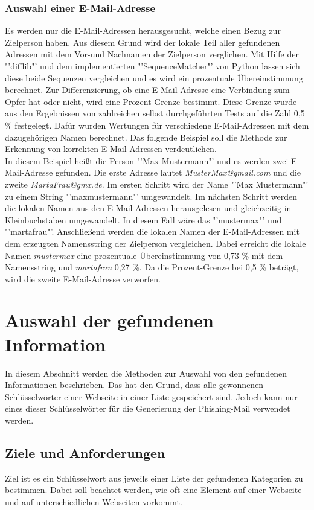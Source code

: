 		\subsubsection{Auswahl einer E-Mail-Adresse}
		Es werden nur die E-Mail-Adressen herausgesucht, welche einen Bezug zur Zielperson haben. Aus diesem Grund wird der lokale Teil aller gefundenen Adressen mit dem Vor-und Nachnamen der Zielperson verglichen. Mit Hilfe der "'difflib"' und dem implementierten "'SequenceMatcher"' von Python lassen sich diese beide Sequenzen vergleichen und es wird ein prozentuale Übereinstimmung berechnet. Zur Differenzierung, ob eine E-Mail-Adresse eine Verbindung zum Opfer hat oder nicht, wird eine Prozent-Grenze bestimmt. Diese Grenze wurde aus den Ergebnissen von zahlreichen selbst durchgeführten Tests auf die Zahl 0,5 \% festgelegt. Dafür wurden Wertungen für verschiedene E-Mail-Adressen mit dem dazugehörigen Namen berechnet. Das folgende Beispiel soll die Methode zur Erkennung von korrekten E-Mail-Adressen verdeutlichen.\\
		In diesem Beispiel heißt die Person "'Max Mustermann"' und es werden zwei E-Mail-Adresse gefunden. Die erste Adresse lautet \textit{MusterMax@gmail.com} und die zweite \textit{MartaFrau@gmx.de}. Im ersten Schritt wird der Name "'Max Mustermann"' zu einem String "'maxmustermann"' umgewandelt. Im nächsten Schritt werden die lokalen Namen aus den E-Mail-Adressen herausgelesen und gleichzeitig in Kleinbuchstaben umgewandelt. In diesem Fall wäre das "'mustermax"' und "'martafrau"'. Anschließend werden die lokalen Namen der E-Mail-Adressen mit dem erzeugten Namensstring der Zielperson vergleichen. Dabei erreicht die lokale Namen \textit{mustermax} eine prozentuale Übereinstimmung von 0,73 \% mit dem Namensstring und \textit{martafrau} 0,27 \%. Da die Prozent-Grenze bei 0,5 \% beträgt, wird die zweite E-Mail-Adresse verworfen.
		
\section{Auswahl der gefundenen Information}
In diesem Abschnitt werden die Methoden zur Auswahl von den gefundenen Informationen beschrieben. Das hat den Grund, dass alle gewonnenen Schlüsselwörter einer Webseite in einer Liste gespeichert sind. Jedoch kann nur eines dieser Schlüsselwörter für die Generierung der Phishing-Mail verwendet werden.
	\subsection{Ziele und Anforderungen}
	Ziel ist es ein Schlüsselwort aus jeweils einer Liste der gefundenen Kategorien zu bestimmen. Dabei soll beachtet werden, wie oft eine Element auf einer Webseite und auf unterschiedlichen Webseiten vorkommt.
	

